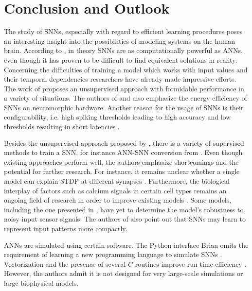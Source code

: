 \section{Conclusion and Outlook}
\label{sec:conclusion}
The study of \acp{SNN}, especially with regard to efficient learning procedures poses an interesting insight into the possibilities of modeling
systems on the human brain.
According to \cite{ANN_SNN_conversion}, in theory \acp{SNN} are as computationally powerful as \acp{ANN}, 
even though it has proven to be difficult to find equivalent solutions in reality.
Concerning the difficulties of training a model which works with input values and their temporal dependencies researchers have already made 
impressive efforts.
The work of \cite{SNN} proposes an unsupervised approach with formidable performance in a variety of situations.
The authors of \cite{SNN} and \cite{Synaptic_plasticity} also emphasize the energy efficiency of \acp{SNN} on neuromorphic hardware.
Another reason for the usage of \acp{SNN} is their configurability, 
i.e. high spiking thresholds leading to high accuracy and low thresholds resulting in short latencies \cite{ANN_SNN_conversion}.

Besides the unsupervised approach proposed by \cite{SNN}, there is a variety of supervised methods to train a \ac{SNN}, 
for instance \ac{ANN}-\ac{SNN} conversion from \cite{DIET_SNN}.
Even though existing approaches perform well, the authors emphasize shortcomings and the potential for further research.
For instance, it remains unclear whether a single model can explain \ac{STDP} at different synapses \cite{STDP_hebbian}.
Furthermore, the biological interplay of factors such as calcium signals in certain cell types remains an ongoing field of research 
in order to improve existing models \cite{STDP_hebbian}.
Some models, including the one presented in \cite{object_detection_SNN}, have yet to determine the model's robustness to noisy input sensor signals.
The authors of \cite{object_detection_SNN} also point out that \acp{SNN} may learn to represent input patterns more compactly.

\Acp{ANN} are simulated using certain software.
The Python interface Brian omits the requirement of learning a new programming language to simulate \acp{SNN} \cite{simulation_Brian}.
Vectorization and the presence of several $C$ routines improve run-time efficiency \cite{simulation_Brian}.
However, the authors admit it is not designed for very large-scale simulations or large biophysical models.

